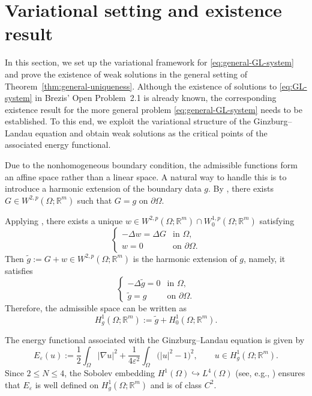 \documentclass[11pt]{amsart}
\theoremstyle{definition}
\theoremstyle{plain}
\newcommand{\abs}[1]{\lvert#1\rvert}
\newcommand{\R}{\mathbb{R}}
\numberwithin{equation}{section}
\begin{document}
\section{Variational setting and existence result}

In this section, we set up the variational framework for \eqref{eq:general-GL-system} and prove the existence of weak solutions in the general setting of Theorem~\ref{thm:general-uniqueness}. Although the existence of solutions to \eqref{eq:GL-system} in Brezis' Open Problem~2.1 is already known, the corresponding existence result for the more general problem \eqref{eq:general-GL-system} needs to be established. To this end, we exploit the variational structure of the Ginzburg--Landau equation and obtain weak solutions as the critical points of the associated energy functional.

Due to the nonhomogeneous boundary condition, the admissible functions
form an affine space rather than a linear space. A natural way to handle
this is to introduce a harmonic extension of the boundary data $g$. By
\cite[Theorem~1.5.1.2]{Grisvard1985}, there exists
$G\in W^{2,p}(\Omega;\R^m)$ such that $G=g$ on $\partial\Omega$.


Applying \cite[Theorem~9.15]{GilbargTrudinger2001}, there exists a unique
$w\in W^{2,p}(\Omega;\R^m)\cap W_0^{1,p}(\Omega;\R^m)$ satisfying
\[
	\begin{cases}
		-\Delta w=\Delta G & \text{in }\Omega,\\
		w=0 & \text{on }\partial\Omega.
	\end{cases}
\]
Then $\widetilde g:=G+w\in W^{2,p}(\Omega;\R^m)$ is the harmonic
extension of $g$, namely, it satisfies
\[
	\begin{cases}
		-\Delta\widetilde g=0 & \text{in }\Omega,\\
		\widetilde g=g & \text{on }\partial\Omega.
	\end{cases}
\]
Therefore, the admissible space can be written as
\[
	H_g^1(\Omega;\R^m)
	:=
	\widetilde g+H_0^1(\Omega;\R^m).
\]

The energy functional associated with the Ginzburg--Landau equation is given by
\[E_\varepsilon(u)
:=
\frac{1}{2}\int_\Omega\abs{\nabla u}^2
+
\frac{1}{4\varepsilon^2}
\int_\Omega\bigl(\abs{u}^2-1\bigr)^2, \qquad
u\in H_g^1(\Omega;\R^m).\]
Since $2\leq N\leq4$, the Sobolev
embedding
$
	H^1(\Omega)\hookrightarrow L^4(\Omega)
$
(see, e.g., \cite{Brezis2011}) ensures that $E_\varepsilon$
is well defined on $H_g^1(\Omega;\R^m)$ and is of class $C^2$.
\end{document}
